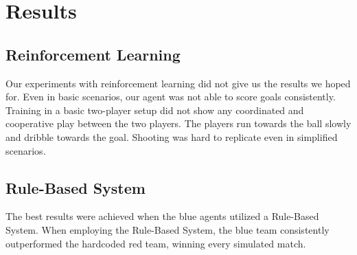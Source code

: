 \section{Results}
\label{section:results}

\subsection{Reinforcement Learning}
Our experiments with reinforcement learning did not give us the results we hoped for.  
Even in basic scenarios, our agent was not able to score goals consistently.  
Training in a basic two-player setup did not show any coordinated and cooperative play between the two players.  
The players run towards the ball slowly and dribble towards the goal.  
Shooting was hard to replicate even in simplified scenarios.  

\subsection{Rule-Based System}
The best results were achieved when the blue agents utilized a Rule-Based System. When employing the Rule-Based System, the blue team consistently outperformed the hardcoded red team, winning every simulated match.

